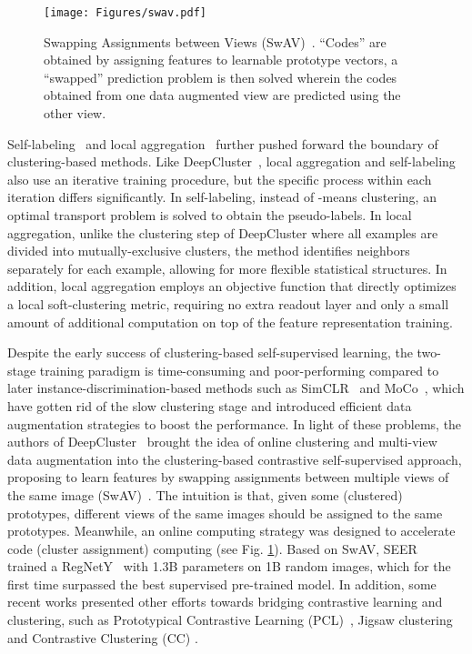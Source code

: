 \documentclass[lettersize,journal]{IEEEtran}
\begin{document}
\begin{figure}
\centering
\texttt{[image: Figures/swav.pdf]}
\caption[SwAV]{Swapping Assignments between Views (SwAV)~\cite{caron2020unsupervised}. “Codes” are obtained by assigning features to learnable prototype vectors, a “swapped” prediction problem is then solved wherein the codes obtained from one data augmented view are predicted using the other view.}
\label{fig:SwAV}
\end{figure}

Self-labeling~\cite{asano2019self} and local aggregation~\cite{zhuang2019local} further pushed forward the boundary of clustering-based methods. Like DeepCluster~\cite{caron2018deep}, local aggregation and self-labeling also use an iterative training procedure, but the specific process within each iteration differs significantly. In self-labeling, instead of -means clustering, an optimal transport problem is solved to obtain the pseudo-labels. In local aggregation, unlike the clustering step of DeepCluster where all examples are divided into mutually-exclusive clusters, the method identifies neighbors separately for each example, allowing for more flexible statistical structures. In addition, local aggregation employs an objective function that directly optimizes a local soft-clustering metric, requiring no extra readout layer and only a small amount of additional computation on top of the feature representation training.



Despite the early success of clustering-based self-supervised learning, the two-stage training paradigm is time-consuming and poor-performing compared to later instance-discrimination-based methods such as SimCLR~\cite{chen2020simple} and MoCo~\cite{he2020momentum}, which have gotten rid of the slow clustering stage and introduced efficient data augmentation strategies to boost the performance. In light of these problems, the authors of DeepCluster~\cite{caron2018deep} brought the idea of online clustering and multi-view data augmentation into the clustering-based contrastive self-supervised approach, proposing to learn features by swapping assignments between multiple views of the same image (SwAV)~\cite{caron2020unsupervised}. The intuition is that, given some (clustered) prototypes, different views of the same images should be assigned to the same prototypes. Meanwhile, an online computing strategy was designed to accelerate code (cluster assignment) computing (see Fig. \ref{fig:SwAV}). Based on SwAV, SEER~\cite{goyal2021self} trained a RegNetY~\cite{radosavovic2020designing} with 1.3B parameters on 1B random images, which for the first time surpassed the best supervised pre-trained model. In addition, some recent works presented other efforts towards bridging contrastive learning and clustering, such as Prototypical Contrastive Learning (PCL)~\cite{li2020prototypical}, Jigsaw clustering~\cite{Chen_2021_CVPR} and Contrastive Clustering (CC) \cite{li2021contrastive}.
\end{document}
